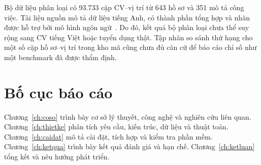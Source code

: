 Bộ dữ liệu phân loại có 93.733 cặp CV–vị trí từ 643 hồ sơ và 351 mô tả công việc. Tài liệu nguồn mô tả dữ liệu tiếng Anh, có thành phần tổng hợp và nhãn được hỗ trợ bởi mô hình ngôn ngữ~\cite{ResumeJobFit2026}. Do đó, kết quả bộ phân loại chưa thể suy rộng sang CV tiếng Việt hoặc tuyển dụng thật. Tập nhãn so sánh thứ hạng cho một số cặp hồ sơ–vị trí trong kho mã cũng chưa đủ căn cứ để báo cáo chỉ số như một benchmark đã được thẩm định.

\section{Bố cục báo cáo}
Chương~\ref{ch:coso} trình bày cơ sở lý thuyết, công nghệ và nghiên cứu liên quan. Chương~\ref{ch:thietke} phân tích yêu cầu, kiến trúc, dữ liệu và thuật toán. Chương~\ref{ch:caidat} mô tả cài đặt, tích hợp và kiểm tra phần mềm. Chương~\ref{ch:ketqua} trình bày kết quả đánh giá và hạn chế. Chương~\ref{ch:ketluan} tổng kết và nêu hướng phát triển.

